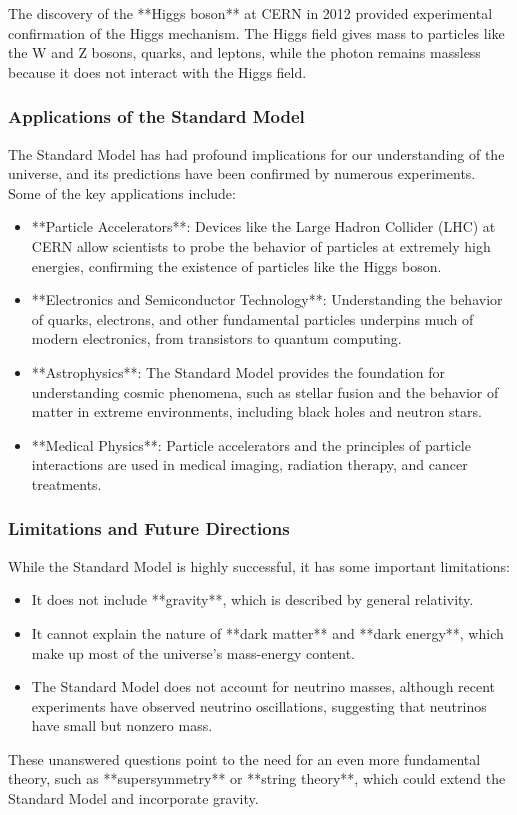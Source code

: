 \documentclass{article}
\begin{document}
The discovery of the **Higgs boson** at CERN in 2012 provided experimental confirmation of the Higgs mechanism. The Higgs field gives mass to particles like the W and Z bosons, quarks, and leptons, while the photon remains massless because it does not interact with the Higgs field.

\subsubsection*{Applications of the Standard Model}

The Standard Model has had profound implications for our understanding of the universe, and its predictions have been confirmed by numerous experiments. Some of the key applications include:

\begin{itemize}
    \item **Particle Accelerators**: Devices like the Large Hadron Collider (LHC) at CERN allow scientists to probe the behavior of particles at extremely high energies, confirming the existence of particles like the Higgs boson.
    \item **Electronics and Semiconductor Technology**: Understanding the behavior of quarks, electrons, and other fundamental particles underpins much of modern electronics, from transistors to quantum computing.
    \item **Astrophysics**: The Standard Model provides the foundation for understanding cosmic phenomena, such as stellar fusion and the behavior of matter in extreme environments, including black holes and neutron stars.
    \item **Medical Physics**: Particle accelerators and the principles of particle interactions are used in medical imaging, radiation therapy, and cancer treatments.
\end{itemize}

\subsubsection*{Limitations and Future Directions}

While the Standard Model is highly successful, it has some important limitations:
\begin{itemize}
    \item It does not include **gravity**, which is described by general relativity.
    \item It cannot explain the nature of **dark matter** and **dark energy**, which make up most of the universe's mass-energy content.
    \item The Standard Model does not account for neutrino masses, although recent experiments have observed neutrino oscillations, suggesting that neutrinos have small but nonzero mass.
\end{itemize}
These unanswered questions point to the need for an even more fundamental theory, such as **supersymmetry** or **string theory**, which could extend the Standard Model and incorporate gravity.
\end{document}
